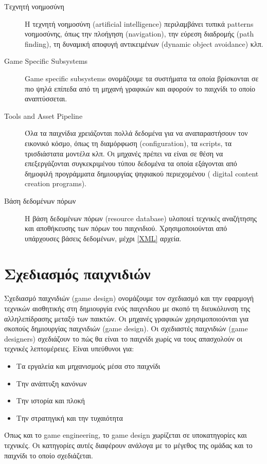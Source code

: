 \begin{description}
\item [Τεχνητή νοημοσύνη]Η τεχνητή νοημοσύνη (artificial intelligence) περιλαμβάνει τυπικά patterns νοημοσύνης, όπως την πλοήγηση (navigation), την εύρεση διαδρομής (path finding), τη δυναμική αποφυγή αντικειμένων (dynamic object avoidance) κλπ.

\item [Game Specific Subsystems]Game specific subsystems ονομάζουμε τα συστήματα τα οποία βρίσκονται σε πιο ψηλά επίπεδα από τη μηχανή γραφικών και αφορούν το παιχνίδι το οποίο αναπτύσσεται.

\item [Tools and Asset Pipeline]Όλα τα παιχνίδια χρειάζονται πολλά δεδομένα για να αναπαραστήσουν τον εικονικό κόσμο, όπως τη διαμόρφωση (configuration), τα scripts, τα τρισδιάστατα μοντέλα κλπ. Οι μηχανές πρέπει να είναι σε θέση να επεξεργάζονται συγκεκριμένου τύπου δεδομένα τα οποία εξάγονται από δημοφιλή προγράμματα δημιουργίας ψηφιακού περιεχομένου ( digital content creation programs).

\item [Βάση δεδομένων πόρων]Η βάση δεδομένων πόρων (resource database) υλοποιεί τεχνικές αναζήτησης και αποθήκευσης των πόρων του παιχνιδιού. Χρησιμοποιούνται από υπάρχουσες βάσεις δεδομένων, μέχρι \ref{XML} αρχεία. 
\end{description}

\section{Σχεδιασμός παιχνιδιών}
Σχεδιασμό παιχνιδιών (game design) ονομάζουμε τον σχεδιασμό και την εφαρμογή τεχνικών αισθητικής στη δημιουργία ενός παιχνιδιου με σκοπό τη διευκόλυνση της αλληλεπίδρασης μεταξύ των παικτών. Οι μηχανές γραφικών χρησιμοποιούνται για σκοπούς δημιουργίας παιχνιδιών (game design). Οι σχεδιαστές παιχνιδιών (game designers) σχεδιάζουν το πώς θα είναι το παιχνίδι χωρίς να τους απασχολούν οι τεχνικές λεπτομέρειες. Είναι υπεύθυνοι για:
\begin{itemize}
	\item Τα εργαλεία και μηχανισμούς μέσα στο παιχνίδι
	\item Την ανάπτυξη κανόνων
	\item Την ιστορία και πλοκή
	\item Την στρατηγική και την τυχαιότητα	
\end{itemize}

Όπως και το game engineering, το game design χωρίζεται σε υποκατηγορίες και τεχνικές. Οι κατηγορίες αυτές διαφέρουν ανάλογα με το μέγεθος της ομάδας και το παιχνίδι το οποίο σχεδιάζεται.


